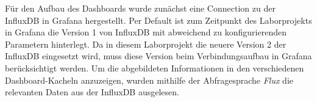 Für den Aufbau des Dashboards wurde zunächst eine Connection zu der InfluxDB in Grafana hergestellt. Per Default ist zum Zeitpunkt des Laborprojekts in Grafana die Version 1 von InfluxDB mit abweichend zu konfigurierenden Parametern hinterlegt. Da in diesem Laborprojekt die neuere Version 2 der InfluxDB eingesetzt wird, muss diese Version beim Verbindungsaufbau in Grafana berücksichtigt werden. 
Um die abgebildeten Informationen in den verschiedenen Dashboard-Kacheln anzuzeigen, wurden mithilfe der Abfragesprache \textit{Flux} die relevanten Daten aus der InfluxDB ausgelesen. 



